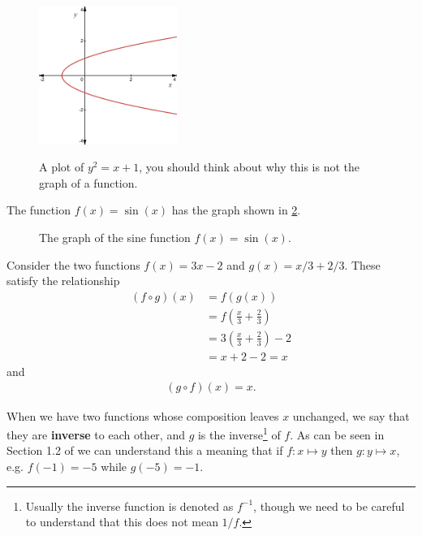 \begin{figure}[ht]
    \centering
    \includegraphics[width=0.4\textwidth, alt={An equation which does not give a graph.}]{figures/desmos-graph_non-function}
    \caption{A plot of $y^{2}=x+1$, you should think about why this is not the graph of a function. }
\label{fig: non equation}
\end{figure}

\begin{ex}The function $f(x)=\sin(x)$ has the graph shown in \cref{fig: sine function graph}.\\
\begin{figure}[htbp]
    \centering
{}
    \caption{The graph of the sine function  $f(x)=\sin(x)$.}
        \label{fig: sine function graph}
\end{figure}
\end{ex}

\begin{ex}
Consider the two functions $f(x)=3x-2$ and $g(x)=x/3 +2/3$. These satisfy the relationship
\begin{align*}
\left(f\circ g\right)(x)	&=f\left(g(x)\right)\\
				&=f\left(\frac{x}{3}+\frac{2}{3}\right)\\
				&=3\left(\frac{x}{3}+\frac{2}{3}\right)-2\\
				&=x+2-2=x
\end{align*}
and 
\begin{align*}
\left(g\circ f\right)(x)=x.
\end{align*}

When we have two functions whose composition leaves $x$ unchanged, we say that they are \textbf{\gls{inverse}} to each other, and $g$ is the inverse\footnote{Usually the inverse function is denoted as $f^{-1}$, though we need to be careful to understand that this does not mean $1/f$.} of $f$. As can be seen in Section 1.2 of \citep{calcI} we can understand this a meaning that if $f:x\mapsto y$ then $g:y\mapsto x$, e.g. $f(-1)=-5$ while $g(-5)=-1$.
\end{ex}


